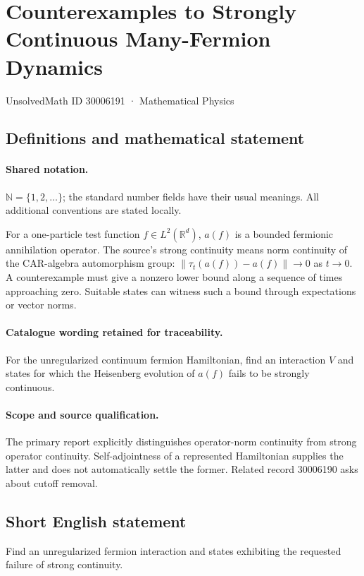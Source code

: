 \documentclass[11pt]{article}
\begin{document}
\setcounter{section}{30006190}
\section{Counterexamples to Strongly Continuous Many-Fermion Dynamics}\label{30006191}
{\small UnsolvedMath ID 30006191 · Mathematical Physics}
\subsection{Definitions and mathematical statement}

\paragraph{Shared notation.}$\mathbb N=\{1,2,\ldots\}$; the standard number fields have their usual meanings. All additional conventions are stated locally.


For a one-particle test function $f\in L^2(\mathbb R^d)$, $a(f)$ is a bounded fermionic annihilation operator. The source's strong continuity means norm continuity of the CAR-algebra automorphism group: $\|\tau_t(a(f))-a(f)\|\to0$ as $t\to0$. A counterexample must give a nonzero lower bound along a sequence of times approaching zero. Suitable states can witness such a bound through expectations or vector norms.

\paragraph{Catalogue wording retained for traceability.}
For the unregularized continuum fermion Hamiltonian, find an interaction $V$ and states for which the Heisenberg evolution of $a(f)$ fails to be strongly continuous.

\paragraph{Scope and source qualification.}The primary report explicitly distinguishes operator-norm continuity from strong operator continuity. Self-adjointness of a represented Hamiltonian supplies the latter and does not automatically settle the former. Related record 30006190 asks about cutoff removal.
\subsection{Short English statement}
Find an unregularized fermion interaction and states exhibiting the requested failure of strong continuity.
\end{document}
